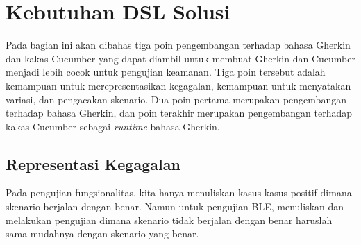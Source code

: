 







\section{Kebutuhan DSL Solusi}

Pada bagian ini akan dibahas tiga poin pengembangan terhadap bahasa Gherkin dan kakas Cucumber
yang dapat diambil untuk membuat Gherkin dan Cucumber menjadi lebih cocok untuk pengujian keamanan.
Tiga poin tersebut adalah kemampuan untuk merepresentasikan kegagalan, kemampuan untuk menyatakan variasi,
dan pengacakan skenario. Dua poin pertama merupakan pengembangan terhadap bahasa Gherkin, dan
poin terakhir merupakan pengembangan terhadap kakas Cucumber sebagai \emph{runtime} bahasa Gherkin.

\subsection{Representasi Kegagalan}

Pada pengujian fungsionalitas, kita hanya menuliskan kasus-kasus positif
dimana skenario berjalan dengan benar. Namun untuk pengujian BLE,
menuliskan dan melakukan pengujian dimana skenario tidak berjalan dengan benar
haruslah sama mudahnya dengan skenario yang benar.

